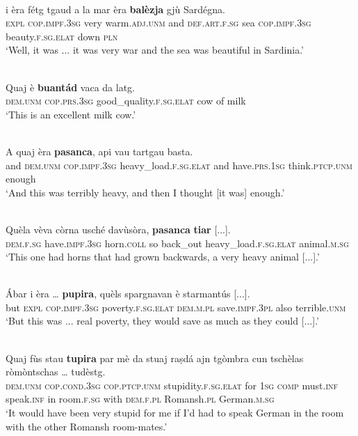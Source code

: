  
\ea
{}\\
	\gll  [...] i èra fétg tgaud a la mar èra \textbf{balèzja} gjù Sardégna.\\
{} \textsc{expl} \textsc{cop.impf.3sg} very warm.\textsc{adj.unm} and \textsc{def.art.f.sg} sea \textsc{cop.impf.3sg} beauty.\textsc{f.sg.elat} down \textsc{pln}\\
\glt `Well, it was ... it was very war and the sea was beautiful in Sardinia.'
\z

\ea
{}\\
\gll  Quaj è \textbf{buantád} vaca da latg. \\
\textsc{dem.unm} \textsc{cop.prs.3sg} good\_quality.\textsc{f.sg.elat} cow of milk\\
\glt `This is an excellent milk cow.'
\z

\ea

\\
\gll  A quaj èra \textbf{pasanca}, api vau tartgau basta.\\
and \textsc{dem.unm} \textsc{cop.impf.3sg} heavy\_load.\textsc{f.sg.elat} and have.\textsc{prs.1sg} think.\textsc{ptcp.unm} enough  \\
\glt `And this was terribly heavy, and then I thought [it was] enough.'
\z

\ea

\\
	\gll  Quèla vèva còrna usché davùsòra, \textbf{pasanca} \textbf{tiar} [...].  \\
\textsc{dem.f.sg} have.\textsc{impf.3sg} horn.\textsc{coll} so back\_out heavy\_load.\textsc{f.sg.elat} animal.\textsc{m.sg} \\
\glt `This one had horns that had grown backwards, a very heavy animal [...].'
\z

\ea
{}\\
\gll   Ábar i èra … \textbf{pupira}, quèls spargnavan è starmantús [...].\\
but \textsc{expl}  \textsc{cop.impf.3sg} poverty.\textsc{f.sg.elat} {} \textsc{dem.m.pl} save.\textsc{impf.3pl} also terrible.\textsc{unm}\\
\glt `But this was ... real poverty, they would save as much as they could [...].'
\z

\ea

\\
\gll    Quaj fùs stau \textbf{tupira} par mè da stuaj raṣdá ajn tgòmbra cun tschèlas ròmòntschas … tudèstg.\\
\textsc{dem.unm} \textsc{cop.cond.3sg} \textsc{cop.ptcp.unm} stupidity.\textsc{f.sg.elat}  for \textsc{1sg} \textsc{comp} must.\textsc{inf} speak.\textsc{inf} in room.\textsc{f.sg} with \textsc{dem.f.pl} Romansh.\textsc{pl} {} German.\textsc{m.sg}\\
\glt `It would have been very stupid for me if I'd had to speak German in the room with the other Romansh room-mates.'
\z

